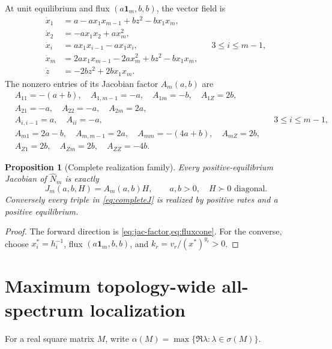 \documentclass[11pt]{article}
\newtheorem{proposition}[theorem]{Proposition}
\theoremstyle{definition}
\newcommand{\1}{\mathbf 1}
\newcommand{\alphaS}{\alpha}
\begin{document}
At unit equilibrium and flux $(a\1_m,b,b)$, the vector field is
\begin{align}
\dot x_1&=a-a x_1x_{m-1}+bz^2-bx_1x_m,\nonumber\\
\dot x_2&=-a x_1x_2+a x_m^2,\nonumber\\
\dot x_i&=a x_1x_{i-1}-a x_1x_i,&&3\le i\le m-1,\label{eq:ode}\\
\dot x_m&=2a x_1x_{m-1}-2a x_m^2+bz^2-bx_1x_m,\nonumber\\
\dot z&=-2bz^2+2bx_1x_m.\nonumber
\end{align}
The nonzero entries of its Jacobian factor $A_m(a,b)$ are
\begin{align}
&A_{11}=-(a+b),\quad A_{1,m-1}=-a,\quad A_{1m}=-b,\quad A_{1Z}=2b,\nonumber\\
&A_{21}=-a,\quad A_{22}=-a,\quad A_{2m}=2a,\nonumber\\
&A_{i,i-1}=a,\quad A_{ii}=-a,&&3\le i\le m-1,\label{eq:Apattern}\\
&A_{m1}=2a-b,\quad A_{m,m-1}=2a,\quad A_{mm}=-(4a+b),\quad A_{mZ}=2b,\nonumber\\
&A_{Z1}=2b,\quad A_{Zm}=2b,\quad A_{ZZ}=-4b.\nonumber
\end{align}

\begin{proposition}[Complete realization family]\label{prop:realization}
Every positive-equilibrium Jacobian of $\widehat N_m$ is exactly
\begin{equation}\label{eq:completeJ}
 J_m(a,b,H)=A_m(a,b)H,
 \qquad a,b>0,\quad H\succ0\text{ diagonal}.
\end{equation}
Conversely every triple in \eqref{eq:completeJ} is realized by positive rates
and a positive equilibrium.
\end{proposition}

\begin{proof}
The forward direction is \cref{eq:jac-factor,eq:fluxcone}.  For the converse,
choose $x_i^*=h_i^{-1}$, flux $(a\1_m,b,b)$, and
$k_r=v_r/(x^*)^{y_r}>0$.
\end{proof}

\section{Maximum topology-wide all-spectrum localization}

For a real square matrix $M$, write
$\alphaS(M)=\max\{\Re\lambda:\lambda\in\sigma(M)\}$.
\end{document}
